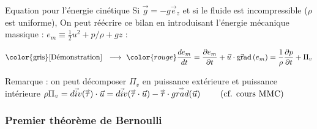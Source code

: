 \begin{frame}{Equation pour l'énergie cinétique}
Si $\vec g = -g \vec{e}_z$ et si le fluide est incompressible ($\rho$ est uniforme),
On peut réécrire ce bilan en introduisant l'énergie mécanique massique : 
$e_m \equiv  \frac{1}{2} u^2 + p/\rho  + g z $ :


\begin{equation}
  \mbox{\color{gris} [Démonstration] \; $\longrightarrow$ \;}
	\color{rouge}
  \ddt{e_m} = \dpdt{e_m} + \myvec{u}\cdot \gradient \left (e_m\right)
  = 
\frac{1}{\rho} \frac{\partial p}{\partial t} + \Pi_v 
\end{equation}

\pause
\medskip
\small

Remarque : on peut décomposer $\Pi_v$ en puissance extérieure et puissance intérieure 
 $\rho \Pi_v = \vec{div}({\accentset{\Rightarrow}{\tau}}) \cdot \vec{u} 
=  \vec{div}({\accentset{\Rightarrow}{\tau}} \cdot \vec{u} )
- \accentset{\Rightarrow}{\tau} \cdot  \accentset{\Rightarrow}{grad} (\vec{u}) 
\qquad \mbox{ (cf. cours MMC) }
$ 


\vspace{0mm}

\end{frame}



\subsubsection{Premier théorème de Bernoulli}


